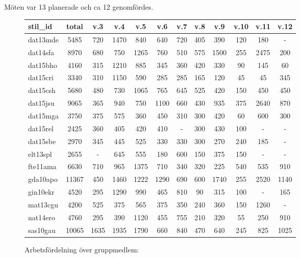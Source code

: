 \documentclass[paper=a4, fontsize=11pt,twoside]{article}
\begin{document}
Möten var 13 planerade och ca 12 genomfördes. \\

\begin{figure}[h]
\centering
\caption{Arbetsfördelning över gruppmedlem:}
\begin{tabular}{|l|c|c|c|c|c|c|c|c|c|c|c|}
\hline
{\fontsize{8pt}{0.2cm}\selectfont stil\_id} & {\fontsize{8pt}{0.2cm}\selectfont
total} & {\fontsize{8pt}{0.2cm}\selectfont v.3} &
{\fontsize{8pt}{0.2cm}\selectfont v.4} & {\fontsize{8pt}{0.2cm}\selectfont v.5}
& {\fontsize{8pt}{0.2cm}\selectfont v.6} & {\fontsize{8pt}{0.2cm}\selectfont v.7}
& {\fontsize{8pt}{0.2cm}\selectfont v.8} & {\fontsize{8pt}{0.2cm}\selectfont v.9}
& {\fontsize{8pt}{0.2cm}\selectfont v.10} & {\fontsize{8pt}{0.2cm}\selectfont
v.11} & {\fontsize{8pt}{0.2cm}\selectfont v.12} \\
\hline
dat13mde & 5485 & 720 & 1470 & 840 & 640 & 720 & 405 & 390 & 120 & 180 & - \\
\hline
dat14sfa & 8970 & 680 & 750 & 1265 & 760 & 510 & 575 & 1500 & 255 & 2475 & 200
\\
\hline
dat15bho & 4160 & 315 & 1210 & 885 & 345 & 360 & 420 & 330 & 90 & 145 & 60 \\
\hline
dat15cri & 3340 & 310 & 1150 & 590 & 285 & 285 & 165 & 120 & 45 & 45 & 345 \\
\hline
dat15csh & 5680 & 480 & 730 & 1065 & 765 & 645 & 525 & 420 & 150 & 450 & 450 \\
\hline
dat15jsu & 9065 & 365 & 940 & 750 & 1100 & 660 & 430 & 935 & 375 & 2640 & 870 \\
\hline
dat15mga & 3750 & 375 & 575 & 360 & 450 & 310 & 300 & 420 & 60 & 600 & 300 \\
\hline
dat15rel & 2425 & 360 & 405 & 420 & 410 & - & 300 & 430 & 100 & - & - \\
\hline
dat15sbe & 2970 & 345 & 445 & 525 & 330 & 330 & 300 & 270 & 240 & 185 & - \\
\hline
elt13spl & 2655 & - & 645 & 555 & 180 & 600 & 150 & 375 & 150 & - & - \\
\hline
fte11ama & 6630 & 710 & 965 & 1375 & 710 & 340 & 320 & 225 & 540 & 535 & 910 \\
\hline
gda10apo & 11367 & 450 & 1460 & 1222 & 1290 & 690 & 600 & 1740 & 255 & 2520 &
1140
\\
\hline
gin10ekr & 4520 & 295 & 1290 & 990 & 465 & 810 & 90 & 315 & 100 & - & 165 \\
\hline
mat13cgu & 4200 & 525 & 375 & 565 & 375 & 350 & 240 & 360 & 150 & 1260 & - \\
\hline
nat14ero & 4760 & 295 & 390 & 1120 & 455 & 755 & 210 & 320 & 55 & 250 & 910 \\
\hline
sas10gau & 10065 & 1635 & 1935 & 1790 & 660 & 840 & 470 & 640 & 245 & 825 &
1025 \\
\hline
\end{tabular}
\end{figure}
\end{document}
